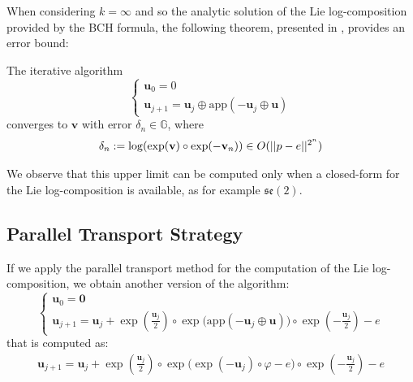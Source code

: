 When considering $k = \infty$ and so the analytic solution of the Lie log-composition provided by the BCH formula, the following theorem, presented in \cite{Bossa:08}, provides an error bound:
\begin{theorem}[Bossa]\label{th:bossa}
	The iterative algorithm 
	\begin{equation}
	\begin{cases}
	\mathbf{u}_0 = 0 \\
	\mathbf{u}_{j+1} %
	                          = \mathbf{u}_{j} \oplus  \text{app}(-\mathbf{u}_{j}  \oplus  \mathbf{u} )
	\end{cases}
	\end{equation}
	converges to $\mathbf{v}$ with error $\delta_n \in \mathbb{G}$, where
	\begin{align*}
	\delta_{n} := \log(\exp(\mathbf{v})\circ \exp(-\mathbf{v}_{n})) \in O(\vert\lvert p - e \rvert\vert^{2^{n}})
	\end{align*}
\end{theorem}

We observe that this upper limit can be computed only when a closed-form for the Lie log-composition is available, as for example $\mathfrak{se}(2)$.

\subsection{Parallel Transport Strategy}

If we apply the parallel transport method for the computation of the Lie log-composition, we obtain another version of the algorithm:
\begin{equation}\label{eq:bossa_parallel_strategy}
\begin{cases}
\mathbf{u}_0 = \mathbf{0} \\
\mathbf{u}_{j+1} 
= 
\mathbf{u}_{j} 
+ 
\exp(\frac{\mathbf{u}_{j}}{2}) \circ \exp\Big(   \text{app}(-\mathbf{u}_{j}  \oplus  \mathbf{u} ) \Big)
\circ 
\exp(-\frac{\mathbf{u}_{j}}{2}) - e
\end{cases}
\end{equation}
that is computed as:
\begin{align*}
\mathbf{u}_{j+1} 
= 
\mathbf{u}_{j} 
+ 
\exp(\frac{\mathbf{u}_{j}}{2}) \circ \exp\Big(   \exp(-\mathbf{u}_{j}) \circ\varphi  - e \Big)
\circ 
\exp(-\frac{\mathbf{u}_{j}}{2}) - e
\end{align*}

